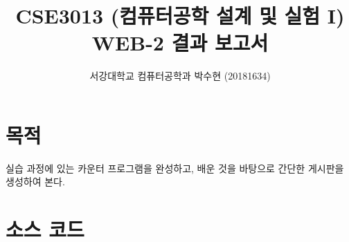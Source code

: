 



\title{CSE3013 (컴퓨터공학 설계 및 실험 I) \space \newline WEB-2 결과 보고서}
\author{서강대학교 컴퓨터공학과 박수현 (20181634)}
\maketitle

\section{목적}
실습 과정에 있는 카운터 프로그램을 완성하고, 배운 것을 바탕으로 간단한 게시판을 생성하여 본다.

\section{소스 코드}

\inputminted[xleftmargin=\parindent,linenos]{php}{inc-sources/source-web2.php}
  

